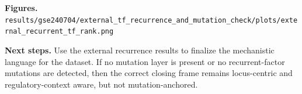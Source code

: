 \textbf{Figures.}
\texttt{results/gse240704/external\_tf\_recurrence\_and\_mutation\_check/plots/external\_recurrent\_tf\_rank.png}

\textbf{Next steps.}
Use the external recurrence results to finalize the mechanistic language for the dataset. If no mutation layer is present or no recurrent-factor mutations are detected, then the correct closing frame remains locus-centric and regulatory-context aware, but not mutation-anchored.
